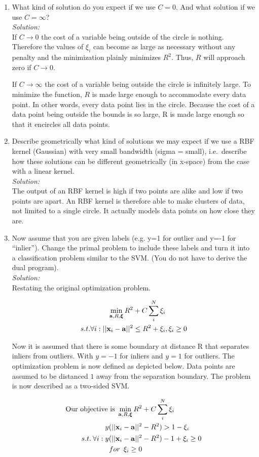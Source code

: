 \documentclass[12pt,a4paper]{article}
\newcommand{\xscalar}{x}
\newcommand{\xvec}{{\bf \xscalar}}
\newcommand{\avec}{\mathbf{a}}
\newcommand{\xivec}{\boldsymbol{\xi}}
\begin{document}
\begin{enumerate}
\item What kind of solution do you expect if we use $C=0$. And what solution if we use $C=\infty$? \\
\emph{Solution:} \\
If $C \to 0$ the cost of a variable being outside of the circle is nothing. Therefore the values of $\xi_i$ can become as large as necessary without any penalty and the minimization plainly minimizes $R^2$. Thus, $R$ will approach zero if $C \to 0$.

If $C\to\infty$ the cost of a variable being outside the circle is infinitely large. To minimize the function, $R$ is made large enough to accommodate every data point. In other words, every data point lies in the circle. Because the cost of a data point being outside the bounds is so large, R is made large enough so that it encircles all data points.

\item Describe geometrically what kind of solutions we may expect if we use a RBF kernel (Gaussian) with very small bandwidth (sigma = small), i.e.~describe how these solutions can be different geometrically (in x-space) from the case with a linear kernel. \\
\emph{Solution:} \\
The output of an RBF kernel is high if two points are alike and low if two points are apart. An RBF kernel is therefore able to make clusters of data, not limited to a single circle. It actually models data points on how close they are. 


\item Now assume that you are given labels (e.g. y=1 for outlier and y=-1 for ``inlier'').  Change the primal problem to include these labels and turn it into a classification problem similar to the SVM. (You do not have to derive the dual program). \\
\emph{Solution:} \\
Restating the original optimization problem.

\begin{align*}
\min_{\avec, R, \xivec} R^2 &+ C \sum_i^N \xi_i \\
s.t. \forall i : ||\xvec_i - \avec||^2 &\leq R^2 + \xi_i, \xi_i \geq 0
\end{align*}

Now it is assumed that there is some boundary at distance R that separates inliers from outliers. With $y = -1$ for inliers and $y = 1$ for outliers. The optimization problem is now defined as depicted below. Data points are assumed to be distanced $1$ away from the separation boundary. The problem is now described as a two-sided SVM.

\begin{align*}
\text{Our objective is } \min_{\avec, R, \xivec} R^2 &+ C \sum_i^N \xi_i \\
y (||\xvec_i - \avec||^2 &- R^2) > 1 - \xi_i  \\
s.t. \: \forall i : y (||\xvec_i - \avec||^2 &- R^2) - 1 + \xi_i \geq 0 \\
for \enspace \xi_i \geq 0
\end{align*}

\end{enumerate}
\end{document}
